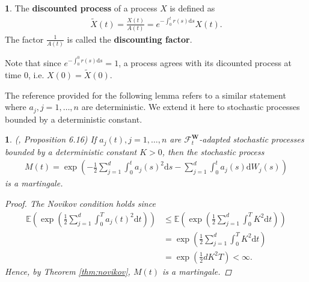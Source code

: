 \documentclass[english]{article}
\numberwithin{equation}{section}
\numberwithin{figure}{section}
\theoremstyle{bolddescit}
\theoremstyle{definition}
\newtheorem{definition}[theorem]{\protect\definitionname}
\theoremstyle{definition}
\theoremstyle{plain}
\newtheorem{lemma}[theorem]{\protect\lemmaname}
\theoremstyle{plain}
\theoremstyle{bolddesc}
\theoremstyle{plain}
\theoremstyle{remark}
\providecommand{\definitionname}{Definition}
\providecommand{\lemmaname}{Lemma}
\begin{document}
\begin{definition}
  The \textbf{discounted process} of a process $X$ is defined as
  \begin{align*}
    \widetilde{X}(t) = \frac{X(t)}{A(t)} = e^{-\int_0^t r(s) \mathrm{d}s} X(t).
  \end{align*}
  The factor $\frac{1}{A(t)}$ is called the \textbf{discounting factor}.
\end{definition}

Note that since $e^{-\int_0^0 r(s) \mathrm{d}s} = 1$, a process agrees with its dicounted process at time 0, i.e. $X(0) = \widetilde{X}(0)$.

The reference provided for the following lemma refers to a similar statement where $a_j, j=1,\ldots,n$ are deterministic. We extend it here to stochastic processes bounded by a deterministic constant.

\begin{lemma}\label{lem:bs-exponential-martingale}
  (\cite{capinski_blackscholes_2012}, Proposition 6.16)
  If $a_j(t), j=1,\ldots,n$ are $\mathcal{F}^\mathbf{W}_t$-adapted stochastic processes bounded by a deterministic constant $K > 0$, then the stochastic process
  \begin{align*}
    M(t) = \exp \left( - \frac{1}{2} \sum_{j=1}^{d} \int_0^t a_j(s)^2 \mathrm{d}s - \sum_{j=1}^{d} \int_0^t a_j(s) \mathrm{d}W_j(s) \right)
  \end{align*}
  is a martingale.

  \begin{proof}
    The Novikov condition holds since
    \begin{align*}
      \mathbb{E}\left(\exp \left(\frac{1}{2} \sum_{j=1}^d \int_0^T a_j(t)^2 \mathrm{d}t\right)\right)
      &\le \mathbb{E}\left(\exp \left(\frac{1}{2} \sum_{j=1}^d \int_0^T K^2 \mathrm{d}t\right)\right)\\
      &= \exp \left(\frac{1}{2} \sum_{j=1}^d \int_0^T K^2 \mathrm{d}t\right)\\
      &= \exp \left(\frac{1}{2} d K^2 T \right) < \infty.
    \end{align*}
    Hence, by Theorem \ref{thm:novikov}, $M(t)$ is a martingale.
  \end{proof}
\end{lemma}
\end{document}
